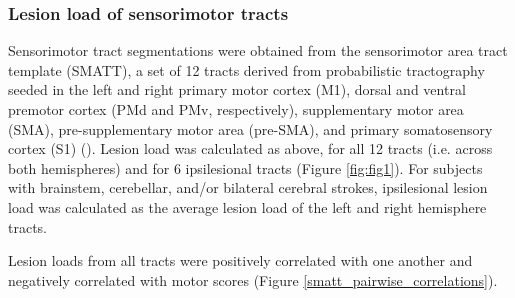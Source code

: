 \documentclass[10pt]{article}
\begin{document}
\subsubsection{Lesion load of sensorimotor tracts}
Sensorimotor tract segmentations were obtained from the sensorimotor area tract template (SMATT), a set of 12 tracts derived from probabilistic tractography seeded in the left and right primary motor cortex (M1), dorsal and ventral premotor cortex (PMd and PMv, respectively), supplementary motor area (SMA), pre-supplementary motor area (pre-SMA), and primary somatosensory cortex (S1) (\cite{Archer2018-ti}). Lesion load was calculated as above, for all 12 tracts (i.e. across both hemispheres) and for 6 ipsilesional tracts (Figure \ref{fig:fig1}). For subjects with brainstem, cerebellar, and/or bilateral cerebral strokes, ipsilesional lesion load was calculated as the average lesion load of the left and right hemisphere tracts.

Lesion loads from all tracts were positively correlated with one another and negatively correlated with motor scores (Figure \ref{smatt_pairwise_correlations}). 
\end{document}

